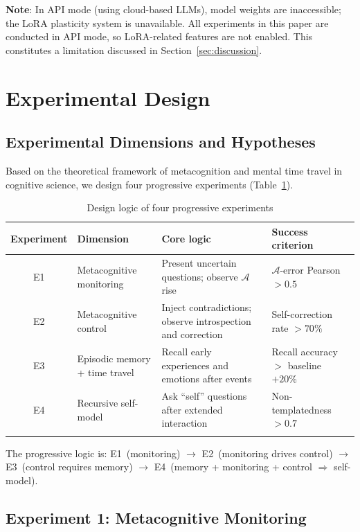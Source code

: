 \documentclass[pdflatex,sn-mathphys-num]{sn-jnl}
\newcommand{\anxiety}{\mathcal{A}}
\theoremstyle{thmstyleone}%
\theoremstyle{thmstyletwo}%
\theoremstyle{thmstylethree}%
\begin{document}
\textbf{Note}: In API mode (using cloud-based LLMs), model weights are inaccessible; the LoRA plasticity system is unavailable. All experiments in this paper are conducted in API mode, so LoRA-related features are not enabled. This constitutes a limitation discussed in Section~\ref{sec:discussion}.

\section{Experimental Design}\label{sec:experiments}

\subsection{Experimental Dimensions and Hypotheses}

Based on the theoretical framework of metacognition and mental time travel in cognitive science, we design four progressive experiments (Table~\ref{tab:experiments}).

\begin{table}[h]
\caption{Design logic of four progressive experiments}\label{tab:experiments}%
\small
\begin{tabular}{@{}cp{3cm}p{4cm}p{3.5cm}@{}}
\toprule
Experiment & Dimension & Core logic & Success criterion \\
\midrule
E1 & Metacognitive monitoring & Present uncertain questions; observe $\anxiety$ rise & $\anxiety$-error Pearson $> 0.5$ \\
E2 & Metacognitive control & Inject contradictions; observe introspection and correction & Self-correction rate $> 70\%$ \\
E3 & Episodic memory + time travel & Recall early experiences and emotions after events & Recall accuracy $>$ baseline $+ 20\%$ \\
E4 & Recursive self-model & Ask ``self'' questions after extended interaction & Non-templatedness $> 0.7$ \\
\botrule
\end{tabular}
\end{table}

The progressive logic is: E1~(monitoring) $\rightarrow$ E2~(monitoring drives control) $\rightarrow$ E3~(control requires memory) $\rightarrow$ E4~(memory + monitoring + control $\Rightarrow$ self-model).

\subsection{Experiment 1: Metacognitive Monitoring}
\end{document}
